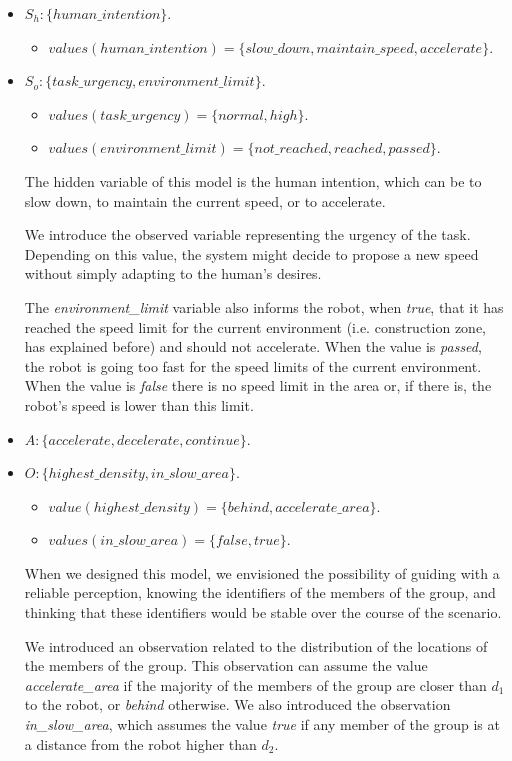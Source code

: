 \begin{itemize}
	\item $S_h:\{human\_intention\}$.
		\begin{itemize}
			\item $values(human\_intention)=\{slow\_down, maintain\_speed, accelerate\}$.
		\end{itemize}
	\item $S_o:\{task\_urgency,environment\_limit\}$.
		\begin{itemize}
			\item $values(task\_urgency)=\{normal,high\}$.
			\item $values(environment\_limit)=\{not\_reached,reached,passed\}$.
		\end{itemize}
		The hidden variable of this model is the human intention, which can be to slow down, to maintain the current speed, or to accelerate.

		We introduce the observed variable representing the urgency of the task. Depending on this value, the system might decide to propose a new speed without simply  adapting to the human's desires.

		The \textit{environment\_limit} variable also informs the robot, when \textit{true}, that it has reached the speed limit for the current environment (i.e. construction zone, has explained before) and should not accelerate. When the value is \textit{passed}, the robot is going too fast for the speed limits of the current environment. When the value is \textit{false} there is no speed limit in the area or, if there is, the robot's speed is lower than this limit.
	
	\item $A:\{accelerate,decelerate,continue\}$.
	\item $O:\{highest\_density,in\_slow\_area\}$.
		\begin{itemize}
			\item $value(highest\_density)=\{behind,accelerate\_area\}$.
			\item $values(in\_slow\_area)=\{false,true\}$.
		\end{itemize}

		When we designed this model, we envisioned the possibility of guiding with a reliable perception, knowing the identifiers of the members of the group, and thinking that these identifiers would be stable over the course of the scenario. 

		We introduced an observation related to the distribution of the locations of the members of the group. This observation can assume the value \textit{accelerate\_area} if the majority of the members of the group are closer than $d_1$ to the robot, or \textit{behind} otherwise. We also introduced the observation \textit{in\_slow\_area}, which assumes the value \textit{true} if any member of the group is at a distance from the robot higher than $d_2$.


\end{itemize}
